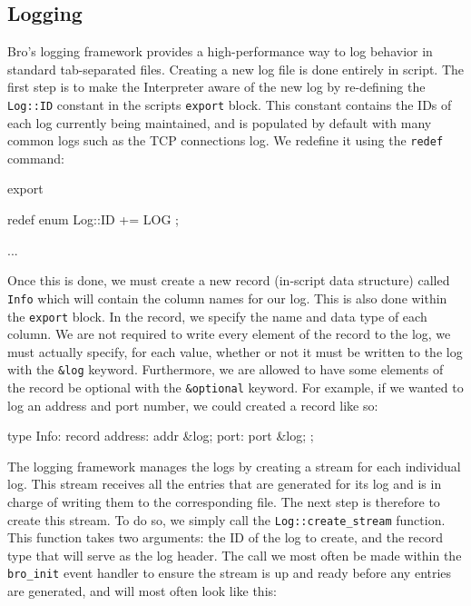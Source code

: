 \subsection{Logging}
Bro's logging framework provides a high-performance way to log behavior in standard tab-separated files. Creating a new log file is done entirely in script. The first step is to make the Interpreter aware of the new log by re-defining the \texttt{Log::ID} constant in the scripts \texttt{export} block. This constant contains the IDs of each log currently being maintained, and is populated by default with many common logs such as the TCP connections log. We redefine it using the \texttt{redef} command: \\

\begin{code}
export {
	redef enum Log::ID += { LOG };
	
	
	...
}
\end{code}

Once this is done, we must create a new record (in-script data structure) called \texttt{Info} which will contain the column names for our log. This is also done within the \texttt{export} block. In the record, we specify the name and data type of each column. We are not required to write every element of the record to the log, we must actually specify, for each value, whether or not it must be written to the log with the \texttt{\&log} keyword. Furthermore, we are allowed to have some elements of the record be optional with the \texttt{\&optional} keyword. For example, if we wanted to log an address and port number, we could created a record like so: \\

\begin{code}
	type Info: record {
		address:		addr &log;
		port:			port &log;	
	};
\end{code}

The logging framework manages the logs by creating a stream for each individual log. This stream receives all the entries that are generated for its log and is in charge of writing them to the corresponding file. The next step is therefore to create this stream. To do so, we simply call the \texttt{Log::create\_stream} function. This function takes two arguments: the ID of the log to create, and the record type that will serve as the log header. The call we most often be made within the \texttt{bro\_init} event handler to ensure the stream is up and ready before any entries are generated, and will most often look like this:\\

